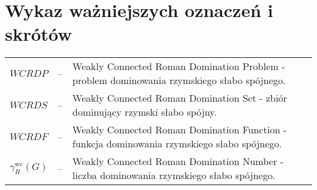 \chapter*{Wykaz ważniejszych oznaczeń i skrótów}

\begin{tabular}{@{} l l p{} @{}}
    $WCRDP$ & -- & Weakly Connected Roman Domination Problem - problem dominowania rzymskiego słabo spójnego.\\
    $WCRDS$ & -- & Weakly Connected Roman Domination Set - zbiór dominujący rzymski słabo spójny.\\
    $WCRDF$ & -- & Weakly Connected Roman Domination Function - funkcja dominowania rzymskiego słabo spójnego. \\
    $\gamma_{R}^{\text{wc}}(G)$ & -- & Weakly Connected Roman Domination Number - liczba dominowania rzymskiego słabo spójnego. \\
\end{tabular}
